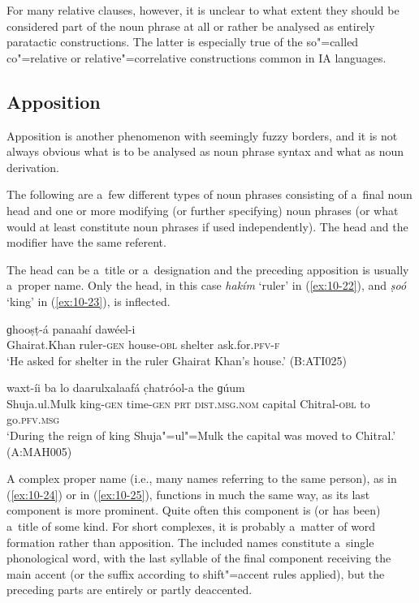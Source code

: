 For many relative clauses, however, it is unclear to what extent they should be considered part of the noun phrase at all or rather be analysed as entirely paratactic constructions. The latter is especially true of the so"=called co"=relative or relative"=correlative constructions common in IA languages. 


\subsection{Apposition}
\label{subsec:10-1-3}

Apposition is another phenomenon with seemingly fuzzy borders, and it is not always obvious what is to be analysed as noun phrase syntax and what as noun derivation.


The following are a~few different types of noun phrases consisting of a~final noun head and one or more modifying (or further specifying) noun phrases (or what would at least constitute noun phrases if used independently). The head and the modifier have the same referent.


The head can be a~title or a~designation and the preceding apposition is usually a~proper name. Only the head, in this case \textit{hakím} `ruler' in (\ref{ex:10-22}), and \textit{ṣoó} `king' in (\ref{ex:10-23}), is inflected.

\begin{exe}
\ex
\label{ex:10-22}
\gll [ɣeyrat"=xaán hakim-í] ɡhooṣṭ-á panaahí dawéel-i \\
Ghairat.Khan ruler-\textsc{gen} house-\textsc{obl} shelter ask.for.\textsc{pfv-f} \\
\glt `He asked for shelter in the ruler Ghairat Khan's house.' (B:ATI025)

\ex
\label{ex:10-23}
 waxt-íi ba lo daarulxalaafá c̣hatróol-a the ɡúum \\
Shuja.ul.Mulk king-\textsc{gen} time-\textsc{gen} \textsc{prt} \textsc{dist.msg.nom}  capital Chitral-\textsc{obl} to go.\textsc{pfv.msg}  \\
\glt `During the reign of king Shuja"=ul"=Mulk the capital was moved to Chitral.' (A:MAH005)
\end{exe}

A complex proper name (i.e., many names referring to the same person), as in (\ref{ex:10-24}) or in (\ref{ex:10-25}), functions in much the same way, as its last component is more prominent. Quite often this component is (or has been) a~title of some kind. For short complexes, it is probably a~matter of word formation rather than apposition. The included names constitute a~single phonological word, with the last syllable of the final component receiving the main accent (or the suffix according to shift"=accent rules applied), but the preceding parts are entirely or partly deaccented.

